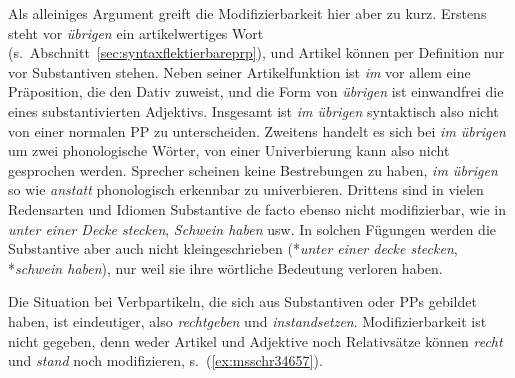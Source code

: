 \begin{exe}
  \ex\label{ex:msschr007} 
  \begin{xlist}
  \end{xlist}
\end{exe}

Als alleiniges Argument greift die Modifizierbarkeit hier aber zu kurz.
Erstens steht vor \textit{übrigen} ein artikelwertiges Wort (s.\ Abschnitt~\ref{sec:syntaxflektierbareprp}), und Artikel können per Definition nur vor Substantiven stehen.
Neben seiner Artikelfunktion ist \textit{im} vor allem eine Präposition, die den Dativ zuweist, und die Form von \textit{übrigen} ist einwandfrei die eines substantivierten Adjektivs.
Insgesamt ist \textit{im übrigen} syntaktisch also nicht von einer normalen PP zu unterscheiden.
Zweitens handelt es sich bei \textit{im übrigen} um zwei phonologische Wörter, von einer Univerbierung kann also nicht gesprochen werden.
Sprecher scheinen keine Bestrebungen zu haben, \textit{im übrigen} so wie \textit{anstatt} phonologisch erkennbar zu univerbieren.
Drittens sind in vielen Redensarten und Idiomen Substantive de facto ebenso nicht modifizierbar, wie \zB in \textit{unter einer Decke stecken}, \textit{Schwein haben} usw.
In solchen Fügungen werden die Substantive aber auch nicht kleingeschrieben (*\textit{unter einer decke stecken}, *\textit{schwein haben}), nur weil sie ihre wörtliche Bedeutung verloren haben.

Die Situation bei Verbpartikeln, die sich aus Substantiven oder PPs gebildet haben, ist eindeutiger, also \zB \textit{rechtgeben} und \textit{instandsetzen}.
Modifizierbarkeit ist nicht gegeben, denn weder Artikel und Adjektive noch Relativsätze können \textit{recht} und \textit{stand} noch modifizieren, s.\ (\ref{ex:msschr34657}).

\begin{exe}
  \ex\label{ex:msschr34657}
  \begin{xlist}
  \end{xlist}
\end{exe}


